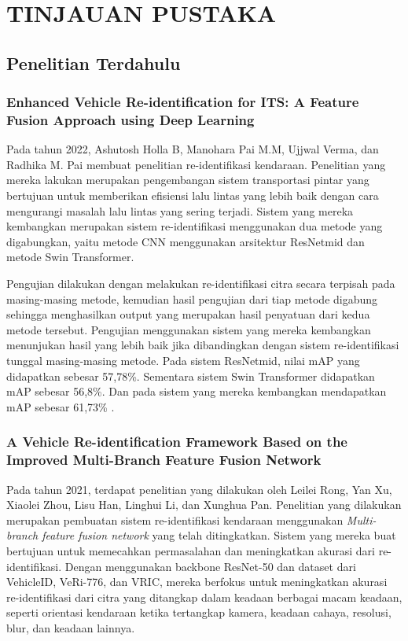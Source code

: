 \chapter{TINJAUAN PUSTAKA}
\label{chap:tinjauanpustaka}

\section{Penelitian Terdahulu}
\label{sec:penelitianterdahulu}

\subsection{Enhanced Vehicle Re-identification for ITS: A Feature Fusion Approach using Deep Learning}

Pada tahun 2022, Ashutosh Holla B, Manohara Pai M.M, Ujjwal Verma, dan Radhika M. Pai membuat penelitian 
re-identifikasi kendaraan. Penelitian yang mereka lakukan merupakan pengembangan sistem transportasi pintar 
yang bertujuan untuk memberikan efisiensi lalu lintas yang lebih baik dengan cara mengurangi masalah lalu 
lintas yang sering terjadi. Sistem yang mereka kembangkan merupakan sistem re-identifikasi menggunakan dua 
metode yang digabungkan, yaitu metode CNN menggunakan arsitektur ResNetmid dan metode Swin Transformer.

Pengujian dilakukan dengan melakukan re-identifikasi citra secara terpisah pada masing-masing metode, 
kemudian hasil pengujian dari tiap metode digabung sehingga menghasilkan output yang merupakan hasil 
penyatuan dari kedua metode tersebut. Pengujian menggunakan sistem yang mereka kembangkan menunjukan hasil 
yang lebih baik jika dibandingkan dengan sistem re-identifikasi tunggal masing-masing metode. Pada sistem 
ResNetmid, nilai mAP yang didapatkan sebesar 57,78\%. Sementara sistem Swin Transformer didapatkan mAP sebesar 
56,8\%. Dan pada sistem yang mereka kembangkan mendapatkan mAP sebesar 61,73\% \parencite{Holla2022}.

\subsection{A Vehicle Re-identification Framework Based on the Improved Multi-Branch Feature Fusion Network}

Pada tahun 2021, terdapat penelitian yang dilakukan oleh Leilei Rong, Yan Xu, Xiaolei Zhou, Lisu Han, Linghui 
Li, dan Xunghua Pan. Penelitian yang dilakukan merupakan pembuatan sistem re-identifikasi kendaraan menggunakan 
\emph{Multi-branch feature fusion network} yang telah ditingkatkan. Sistem yang mereka buat bertujuan untuk memecahkan 
permasalahan dan meningkatkan akurasi dari re-identifikasi. Dengan menggunakan backbone ResNet-50 dan dataset 
dari VehicleID, VeRi-776, dan VRIC, mereka berfokus untuk meningkatkan akurasi re-identifikasi dari citra yang 
ditangkap dalam keadaan berbagai macam keadaan, seperti orientasi kendaraan ketika tertangkap kamera, keadaan 
cahaya, resolusi, blur, dan keadaan lainnya.

